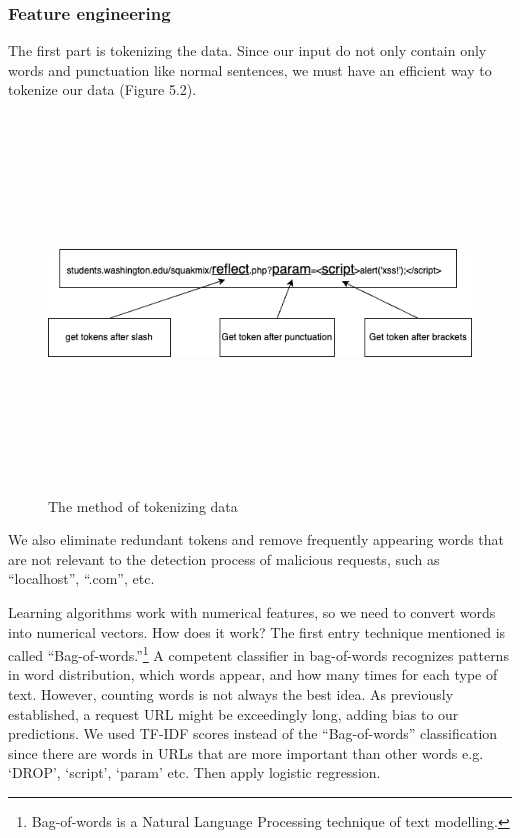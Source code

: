 \subsubsection{Feature engineering}
\hspace{0.5cm}The first part is tokenizing the data. Since our input do not only contain only words and punctuation like normal sentences, we must have an efficient way to tokenize our data (Figure 5.2).

\begin{figure}[!h]
	\centering
	\includegraphics[width=\linewidth, height=10cm,keepaspectratio]{figures/implement1.png}
  \caption{The method of tokenizing data}
\end{figure} 

\newpage
We also eliminate redundant tokens and remove frequently appearing words that are not relevant to the detection process of malicious requests, such as ``localhost'', ``.com'', etc.

Learning algorithms work with numerical features, so we need to convert words into numerical vectors. How does it work? The first entry technique mentioned is called ``Bag-of-words.''\footnote{Bag-of-words is a Natural Language Processing technique of text modelling.}
A competent classifier in bag-of-words recognizes patterns in word distribution, which words appear, and how many times for each type of text. However, counting words is not always the best idea. As previously established, a request URL might be exceedingly long, adding bias to our predictions. We used TF-IDF scores instead of the ``Bag-of-words'' classification since there are words in URLs that are more important than other words e.g. `DROP', `script', `param' etc. Then apply logistic regression.

